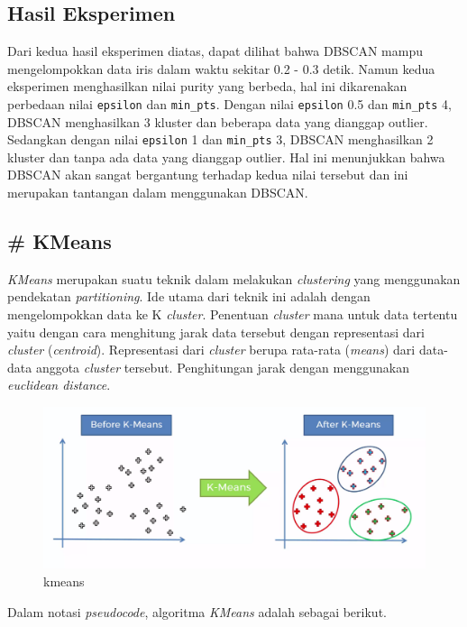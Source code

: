 \documentclass[11pt]{article}
\makeatletter
\def\maxwidth{\ifdim\Gin@nat@width>\linewidth\linewidth
    \else\Gin@nat@width\fi}
\let\Oldincludegraphics\includegraphics
\renewcommand{\includegraphics}[1]{\Oldincludegraphics[width=.8\maxwidth]{#1}}
\makeatother
\begin{document}
    \subsection{Hasil Eksperimen}\label{hasil-eksperimen}

Dari kedua hasil eksperimen diatas, dapat dilihat bahwa DBSCAN mampu
mengelompokkan data iris dalam waktu sekitar 0.2 - 0.3 detik. Namun
kedua eksperimen menghasilkan nilai purity yang berbeda, hal ini
dikarenakan perbedaan nilai \texttt{epsilon} dan \texttt{min\_pts}.
Dengan nilai \texttt{epsilon} 0.5 dan \texttt{min\_pts} 4, DBSCAN
menghasilkan 3 kluster dan beberapa data yang dianggap outlier.
Sedangkan dengan nilai \texttt{epsilon} 1 dan \texttt{min\_pts} 3,
DBSCAN menghasilkan 2 kluster dan tanpa ada data yang dianggap outlier.
Hal ini menunjukkan bahwa DBSCAN akan sangat bergantung terhadap kedua
nilai tersebut dan ini merupakan tantangan dalam menggunakan DBSCAN.

    \subsection{\# KMeans}\label{kmeans}

\emph{KMeans} merupakan suatu teknik dalam melakukan \emph{clustering}
yang menggunakan pendekatan \emph{partitioning}. Ide utama dari teknik
ini adalah dengan mengelompokkan data ke K \emph{cluster}. Penentuan
\emph{cluster} mana untuk data tertentu yaitu dengan cara menghitung
jarak data tersebut dengan representasi dari \emph{cluster}
(\emph{centroid}). Representasi dari \emph{cluster} berupa rata-rata
(\emph{means}) dari data-data anggota \emph{cluster} tersebut.
Penghitungan jarak dengan menggunakan \emph{euclidean distance}.

\begin{figure}[htbp]
\centering
\includegraphics{img/kmeans.png}
\caption{kmeans}
\end{figure}

Dalam notasi \emph{pseudocode}, algoritma \emph{KMeans} adalah sebagai
berikut.
\end{document}

